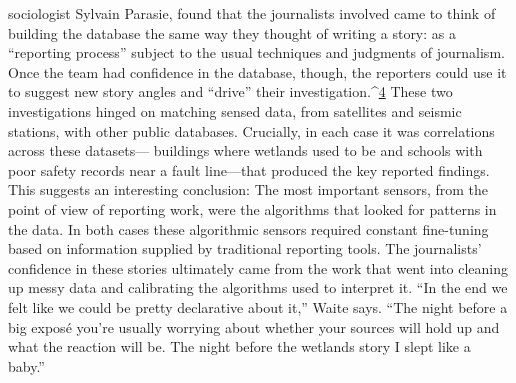 sociologist Sylvain Parasie, found that the journalists involved came to think
of building the database the same way they thought of writing a story: as a
``reporting process'' subject to the usual techniques and judgments of journalism.
Once the team had confidence in the database, though, the reporters
could use it to suggest new story angles and ``drive'' their investigation.^{\href{#endnotes-graves}{4}}
These two investigations hinged on matching sensed data, from satellites
and seismic stations, with other public databases. Crucially, in each case it
was correlations across these datasets— buildings where wetlands used to
be and schools with poor safety records near a fault line—that produced the
key reported findings. This suggests an interesting conclusion: The most
important sensors, from the point of view of reporting work, were the algorithms
that looked for patterns in the data. In both cases these algorithmic
sensors required constant fine-tuning based on information supplied by
traditional reporting tools. The journalists' confidence in these stories ultimately
came from the work that went into cleaning up messy data and calibrating
the algorithms used to interpret it. ``In the end we felt like we could
be pretty declarative about it,'' Waite says. ``The night before a big exposé
you're usually worrying about whether your sources will hold up and what
the reaction will be. The night before the wetlands story I slept like a baby.''

